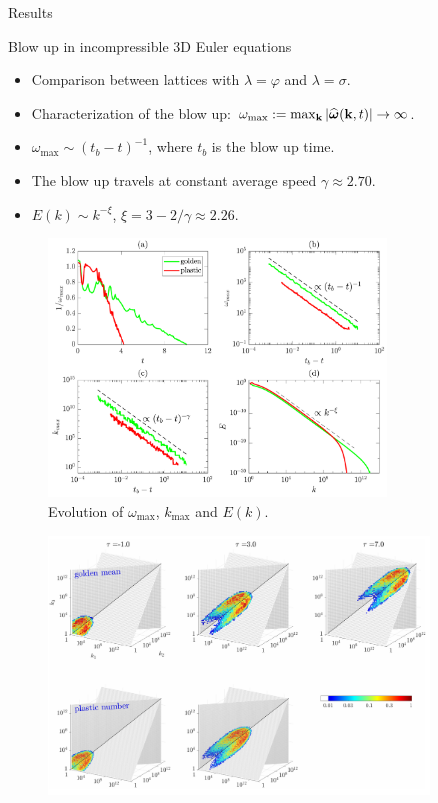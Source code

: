 \documentclass{beamer} %
\begin{document}
{
\begin{frame}[plain]
  \centering\vfill\Huge
  Results
  \vfill
\end{frame}
\addtocounter{framenumber}{-1}
}
\begin{frame}{Blow up in incompressible 3D Euler equations}
  \begin{itemize}
    \item Comparison between lattices with $\lambda=\varphi$ and $\lambda=\sigma$.
    \item Characterization of the blow up: $\omega_\text{max}:=\max_{\boldsymbol{\mathrm{k}}} |\widehat{\boldsymbol{\mathrm{\omega}}}(\boldsymbol{\mathrm{k}},t)|\to \infty$.
    \item $\omega_\text{max}\sim (t_b - t)^{-1}$, where $t_b$ is the blow up time.
    \item The blow up travels at constant average speed $\gamma \approx 2.70$.
    \item $E(k) \sim k^{-\xi}$, $\xi =3-2/\gamma\approx 2.26$.
  \end{itemize}
  \begin{minipage}{0.49\textwidth}
    \begin{figure}
      \centering
      \includegraphics[width=0.8\textwidth]{images/blowup-1.png}
      \caption{Evolution of $\omega_\text{max}$, $k_\text{max}$ and $E(k)$. \cite{campolina}}
    \end{figure}
  \end{minipage}\hfill
  \begin{minipage}{0.49\textwidth}
    \begin{figure}
      \centering
      \includegraphics[width=0.9\textwidth]{images/blowup-2.png}

\end{figure}
\end{minipage}
\end{frame}
\end{document}
